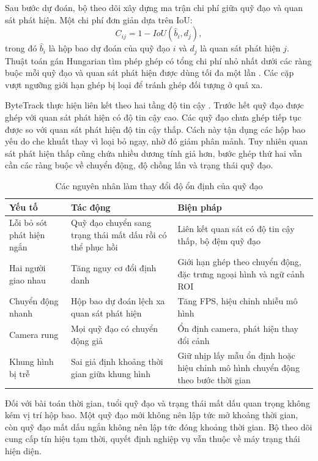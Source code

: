 Sau bước dự đoán, bộ theo dõi xây dựng ma trận chi phí giữa quỹ đạo và quan sát phát hiện. Một chi phí đơn giản dựa trên IoU:
\begin{equation}
 C_{ij}=1-IoU(\hat{b}_i,d_j),
\end{equation}
trong đó $\hat{b}_i$ là hộp bao dự đoán của quỹ đạo $i$ và $d_j$ là quan sát phát hiện $j$. Thuật toán gán Hungarian tìm phép ghép có tổng chi phí nhỏ nhất dưới các ràng buộc mỗi quỹ đạo và quan sát phát hiện được dùng tối đa một lần \cite{hungarian}. Các cặp vượt ngưỡng giới hạn ghép bị loại để tránh ghép đối tượng ở quá xa.

ByteTrack thực hiện liên kết theo hai tầng độ tin cậy \cite{bytetrack}. Trước hết quỹ đạo được ghép với quan sát phát hiện có độ tin cậy cao. Các quỹ đạo chưa ghép tiếp tục được so với quan sát phát hiện độ tin cậy thấp. Cách này tận dụng các hộp bao yếu do che khuất thay vì loại bỏ ngay, nhờ đó giảm phân mảnh. Tuy nhiên quan sát phát hiện thấp cũng chứa nhiều dương tính giả hơn, bước ghép thứ hai vẫn cần các ràng buộc về chuyển động, độ chồng lấn và trạng thái quỹ đạo.

\begin{table}[H]
\centering
\caption{Các nguyên nhân làm thay đổi độ ổn định của quỹ đạo}
\label{tab:track-stability-theory}
\begin{tabularx}{\textwidth}{p{3.5cm}X X}
\toprule
\textbf{Yếu tố} & \textbf{Tác động} & \textbf{Biện pháp}\\
\midrule
Lỗi bỏ sót phát hiện ngắn & Quỹ đạo chuyển sang trạng thái mất dấu rồi có thể phục hồi & Liên kết quan sát có độ tin cậy thấp, bộ đệm quỹ đạo\\
Hai người giao nhau & Tăng nguy cơ đổi định danh & Giới hạn ghép theo chuyển động, đặc trưng ngoại hình và ngữ cảnh ROI\\
Chuyển động nhanh & Hộp bao dự đoán lệch xa quan sát phát hiện & Tăng FPS, hiệu chỉnh nhiễu mô hình\\
Camera rung & Mọi quỹ đạo có chuyển động giả & Ổn định camera, phát hiện thay đổi cảnh\\
Khung hình bị trễ & Sai giả định khoảng thời gian giữa khung hình & Giữ nhịp lấy mẫu ổn định hoặc hiệu chỉnh mô hình chuyển động theo bước thời gian\\
\bottomrule
\end{tabularx}
\end{table}

Đối với bài toán thời gian, tuổi quỹ đạo và trạng thái mất dấu quan trọng không kém vị trí hộp bao. Một quỹ đạo mới không nên lập tức mở khoảng thời gian, còn quỹ đạo mất dấu ngắn không nên lập tức đóng khoảng thời gian. Bộ theo dõi cung cấp tín hiệu tạm thời, quyết định nghiệp vụ vẫn thuộc về máy trạng thái hiện diện.

